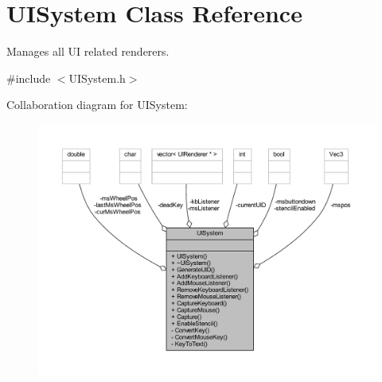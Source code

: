 \hypertarget{class_u_i_system}{\section{U\-I\-System Class Reference}
\label{class_u_i_system}
}


Manages all U\-I related renderers.  




{\ttfamily \#include $<$U\-I\-System.\-h$>$}



Collaboration diagram for U\-I\-System\-:
\nopagebreak
\begin{figure}[H]
\begin{center}
\leavevmode
\includegraphics[width=350pt]{class_u_i_system__coll__graph}
\end{center}
\end{figure}
